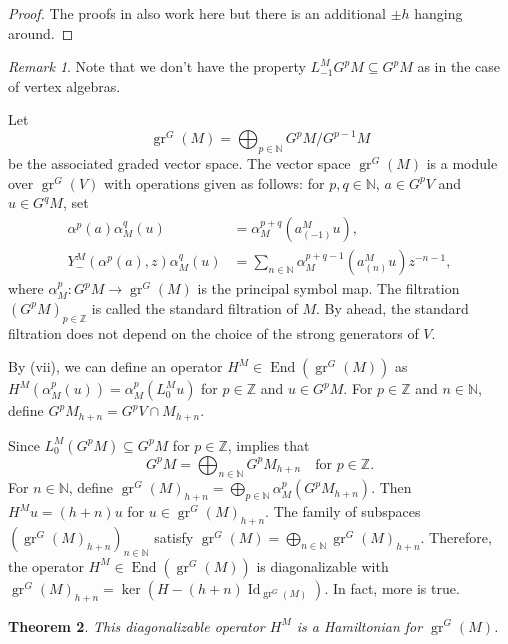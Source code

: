 \documentclass[a4paper, 12pt, reqno]{amsart}
\newtheorem{theorem}{Theorem}[section]
\theoremstyle{remark}
\newtheorem{remark}[theorem]{Remark}
\numberwithin{equation}{subsection}
\DeclareMathOperator{\Id}{Id}
\DeclareMathOperator{\gr}{gr}
\DeclareMathOperator{\End}{End}
\begin{document}
\begin{proof}
  The proofs in \cite{li_vertex_2004} also work here but there is an additional $\pm h$ hanging around.
\end{proof}

\begin{remark}
  \label{rmk:36}
  Note that we don't have the property $L_{-1}^MG^pM \subseteq G^pM$ as in the case of vertex algebras.
\end{remark}

Let
\begin{equation*}
  \gr^G(M) = \bigoplus_{p \in \mathbb{N}}G^pM/G^{p - 1}M
\end{equation*}
be the associated graded vector space.
The vector space $\gr^G(M)$ is a module over $\gr^G(V)$ with operations given as follows: for $p, q \in \mathbb{N}$, $a \in G^pV$ and $u \in G^qM$, set
\begin{align*}
  \alpha^p(a)\alpha_M^q(u) &= \alpha_M^{p + q}(a^M_{(-1)}u), \\
  Y^M_-(\alpha^p(a), z)\alpha_M^q(u) &= \sum_{n \in \mathbb{N}}\alpha_M^{p + q - 1}(a^M_{(n)}u)z^{-n - 1},
\end{align*}
where $\alpha_M^p: G^pM \to \gr^G(M)$ is the principal symbol map.
The filtration $(G^pM)_{p \in \mathbb{Z}}$ is called the standard filtration of $M$.
By  ahead, the standard filtration does not depend on the choice of the strong generators of $V$.

By (vii), we can define an operator $H^M \in \End(\gr^G(M))$ as $H^M(\alpha_M^p(u)) = \alpha_M^p(L^M_0u)$ for $p \in \mathbb{Z}$ and $u \in G^pM$.
For $p \in \mathbb{Z}$ and $n \in \mathbb{N}$, define $G^pM_{h + n} = G^pV \cap M_{h + n}$.

Since $L_0^M(G^pM) \subseteq G^pM$ for $p \in \mathbb{Z}$,  implies that
\begin{equation*}
  G^pM = \bigoplus_{n \in \mathbb{N}}G^pM_{h + n} \quad \text{for }p \in \mathbb{Z}.
\end{equation*}
For $n \in \mathbb{N}$, define $\gr^G(M)_{h + n} = \bigoplus_{p \in \mathbb{N}}\alpha_M^p(G^pM_{h + n})$.
Then $H^Mu = (h + n)u$ for $u \in \gr^G(M)_{h + n}$.
The family of subspaces $(\gr^G(M)_{h + n})_{n \in \mathbb{N}}$ satisfy $\gr^G(M) = \bigoplus_{n \in \mathbb{N}} \gr^G(M)_{h + n}$.
Therefore, the operator $H^M \in \End(\gr^G(M))$ is diagonalizable with $\gr^G(M)_{h + n} = \ker(H - (h + n)\Id_{\gr^G(M)})$.
In fact, more is true.

\begin{theorem}
  \label{thr:47}
  This diagonalizable operator $H^M$ is a Hamiltonian for $\gr^G(M)$.
\end{theorem}
\end{document}
